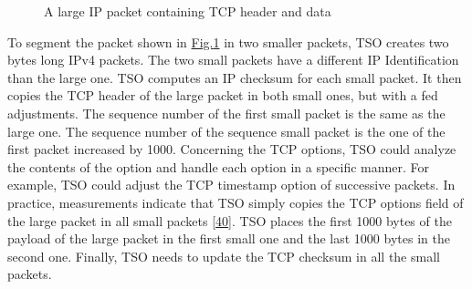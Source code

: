 \documentclass[letterpaper,10pt,english]{sphinxmanual}
\begin{document}
\begin{figure}[htbp]
\caption{A large IP packet containing TCP header and data}\label{\detokenize{mptcp:id82}}\label{\detokenize{mptcp:fig-mptcp-tso}}\end{figure}
\sphinxAtStartPar
To segment the packet shown in \hyperref[\detokenize{mptcp:fig-mptcp-tso}]{Fig.\@ \ref{\detokenize{mptcp:fig-mptcp-tso}}} in two smaller packets, TSO creates two  bytes long IPv4 packets. The two small packets have a different IP Identification than the large one. TSO computes an IP checksum for each small packet. It then copies the TCP header of the large packet in both small ones, but with a fed adjustments. The sequence number of the  first small packet is the same as the large one. The sequence number of the sequence small packet is the one of the first packet increased by 1000.
Concerning the TCP options, TSO could analyze the contents of the option and handle each option in a specific manner. For example, TSO could adjust the TCP timestamp option of successive packets. In practice, measurements indicate that TSO simply copies the TCP options field of the large packet in all small packets {[}\hyperlink{cite.biblio:id8938}{40}{]}. TSO places the first 1000 bytes of the payload of the large packet in the first small one and the last 1000 bytes in the second one. Finally, TSO needs to update the TCP checksum in all the small packets.
\end{document}
